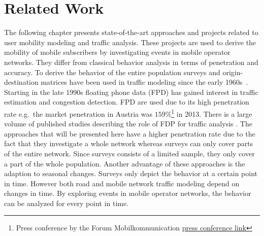 \documentclass[master,english]{hgbthesis}
\begin{document}
\chapter{Related Work}
The following chapter presents state-of-the-art approaches and projects related to user mobility modeling and traffic analysis. These projects are used to derive the mobility of mobile subscribers by investigating events in mobile operator networks. They differ from classical behavior analysis in terms of penetration and accuracy. To derive the behavior of the entire population surveys and origin-destination matrices have been used in traffic modeling since the early 1960s~\cite{Beckmann,Heanue1966,Voorhees}.
Starting in the late 1990s floating phone data (FPD) has gained interest in traffic estimation and congestion detection. FPD are used due to its high penetration rate e.g.\, the market penetration in Austria was $159\%$\footnote{Press conference by the Forum Mobilkommunication \href{http://www.fmk.at/Medien/Pressekonferenzen/FMK-Jahrespressekonferenz-2012}{press conference link}} in 2013. There is a large volume of published studies describing the role of FDP for traffic analysis \cite{Yim2001,Qiu2007,Caceres2008}.
The approaches that will be presented here have a higher penetration rate due to the fact that they investigate a whole network whereas surveys can only cover parts of the entire network. Since surveys consists of a limited sample, they only cover a part of the whole population. Another advantage of these approaches is the adaption to seasonal changes. Surveys only depict the behavior at a certain point in time. However both road and mobile network traffic modeling depend on changes in time. By exploring events in mobile operator networks, the behavior can be analyzed for every point in time.
\end{document}
